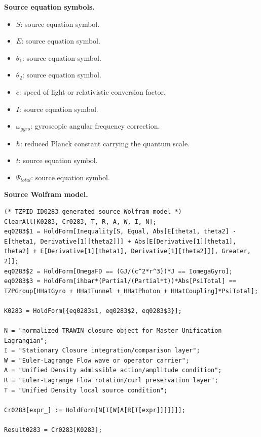 \begin{minipage}[t]{0.49\linewidth}
\begingroup
\small
\raggedright
\textbf{Source equation symbols.}\par
\begin{itemize}[leftmargin=1.35em,itemsep=1pt,topsep=1pt,parsep=0pt]
    \item $S$: source equation symbol.
    \item $E$: source equation symbol.
    \item $\theta_1$: source equation symbol.
    \item $\theta_2$: source equation symbol.
    \item $c$: speed of light or relativistic conversion factor.
    \item $I$: source equation symbol.
    \item $\omega_{gyro}$: gyroscopic angular frequency correction.
    \item $\hbar$: reduced Planck constant carrying the quantum scale.
    \item $t$: source equation symbol.
    \item $\Psi_{total}$: source equation symbol.
\end{itemize}
\endgroup
\end{minipage}\hfill
\begin{minipage}[t]{0.47\linewidth}
\begingroup
\scriptsize
\raggedright
\textbf{Source Wolfram model.}\par
\begin{Verbatim}[fontsize=\tiny,breaklines=true,breakanywhere=true]
(* TZPID ID0283 generated source Wolfram model *)
ClearAll[K0283, Cr0283, T, R, A, W, I, N];
eq0283$1 = HoldForm[Inequality[S, Equal, Abs[E[theta1, theta2] - E[theta1, Derivative[1][theta2]]] + Abs[E[Derivative[1][theta1], theta2] + E[Derivative[1][theta1], Derivative[1][theta2]]], Greater, 2]];
eq0283$2 = HoldForm[OmegaFD == (GJ/(c^2*r^3))*J == IomegaGyro];
eq0283$3 = HoldForm[ihbar*(Partial/(Partial*t))*Abs[PsiTotal] == TZPGroup[HHatGyro + HHatTunnel + HHatPhoton + HHatCoupling]*PsiTotal];

K0283 = HoldForm[{eq0283$1, eq0283$2, eq0283$3}];

N = "normalized TRAWIN closure object for Master Unification Lagrangian";
I = "Stationary Closure integration/comparison layer";
W = "Euler-Lagrange Flow wave or operator carrier";
A = "Unified Density admissible action/amplitude condition";
R = "Euler-Lagrange Flow rotation/curl preservation layer";
T = "Unified Density local source condition";

Cr0283[expr_] := HoldForm[N[I[W[A[R[T[expr]]]]]]];

Result0283 = Cr0283[K0283];
\end{Verbatim}
\endgroup
\end{minipage}

